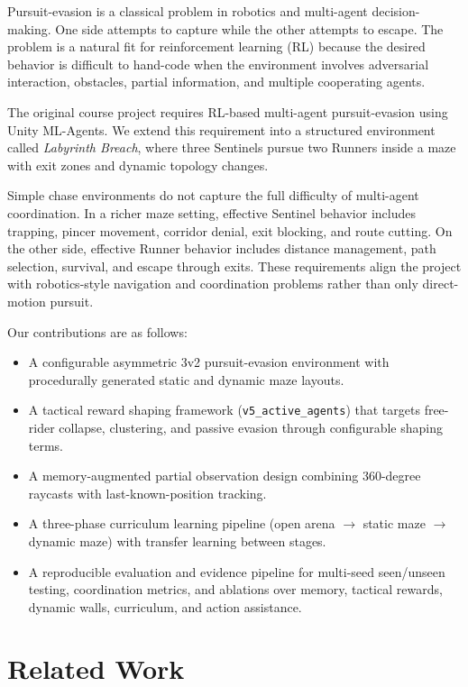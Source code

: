 \documentclass[conference]{IEEEtran}
\begin{document}
Pursuit-evasion is a classical problem in robotics and multi-agent decision-making. One side attempts to capture while the other attempts to escape. The problem is a natural fit for reinforcement learning (RL) because the desired behavior is difficult to hand-code when the environment involves adversarial interaction, obstacles, partial information, and multiple cooperating agents.

The original course project requires RL-based multi-agent pursuit-evasion using Unity ML-Agents. We extend this requirement into a structured environment called \textit{Labyrinth Breach}, where three Sentinels pursue two Runners inside a maze with exit zones and dynamic topology changes.

Simple chase environments do not capture the full difficulty of multi-agent coordination. In a richer maze setting, effective Sentinel behavior includes trapping, pincer movement, corridor denial, exit blocking, and route cutting. On the other side, effective Runner behavior includes distance management, path selection, survival, and escape through exits. These requirements align the project with robotics-style navigation and coordination problems rather than only direct-motion pursuit.

Our contributions are as follows:
\begin{itemize}
    \item A configurable asymmetric 3v2 pursuit-evasion environment with procedurally generated static and dynamic maze layouts.
    \item A tactical reward shaping framework (\texttt{v5\_active\_agents}) that targets free-rider collapse, clustering, and passive evasion through configurable shaping terms.
    \item A memory-augmented partial observation design combining 360-degree raycasts with last-known-position tracking.
    \item A three-phase curriculum learning pipeline (open arena $\to$ static maze $\to$ dynamic maze) with transfer learning between stages.
    \item A reproducible evaluation and evidence pipeline for multi-seed seen/unseen testing, coordination metrics, and ablations over memory, tactical rewards, dynamic walls, curriculum, and action assistance.
\end{itemize}

\section{Related Work}
\end{document}
